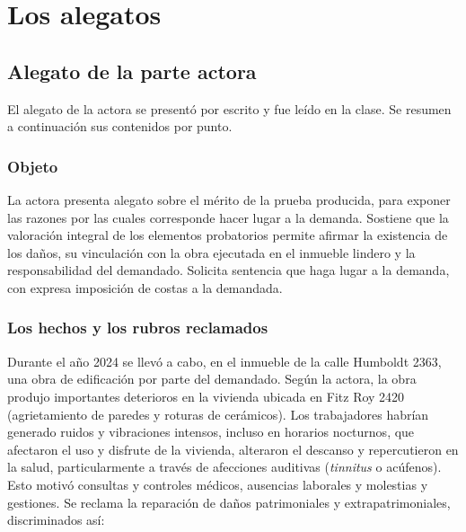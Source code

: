 \documentclass[12pt,oneside]{book}
\begin{document}
\chapter[Los alegatos]{Los alegatos}

\section{Alegato de la parte actora}

El alegato de la actora se present\'o por escrito y fue le\'ido en la clase. Se resumen a continuaci\'on sus contenidos por punto.

\subsection{Objeto}

La actora presenta alegato sobre el m\'erito de la prueba producida, para exponer las razones por las cuales corresponde hacer lugar a la demanda. Sostiene que la valoraci\'on integral de los elementos probatorios permite afirmar la existencia de los da\~nos, su vinculaci\'on con la obra ejecutada en el inmueble lindero y la responsabilidad del demandado. Solicita sentencia que haga lugar a la demanda, con expresa imposici\'on de costas a la demandada.

\subsection{Los hechos y los rubros reclamados}

Durante el a\~no 2024 se llev\'o a cabo, en el inmueble de la calle Humboldt 2363, una obra de edificaci\'on por parte del demandado. Seg\'un la actora, la obra produjo importantes deterioros en la vivienda ubicada en Fitz Roy 2420 (agrietamiento de paredes y roturas de cer\'amicos). Los trabajadores habr\'ian generado ruidos y vibraciones intensos, incluso en horarios nocturnos, que afectaron el uso y disfrute de la vivienda, alteraron el descanso y repercutieron en la salud, particularmente a trav\'es de afecciones auditivas (\emph{tinnitus} o ac\'ufenos). Esto motiv\'o consultas y controles m\'edicos, ausencias laborales y molestias y gestiones. Se reclama la reparaci\'on de da\~nos patrimoniales y extrapatrimoniales, discriminados as\'i:
\end{document}
